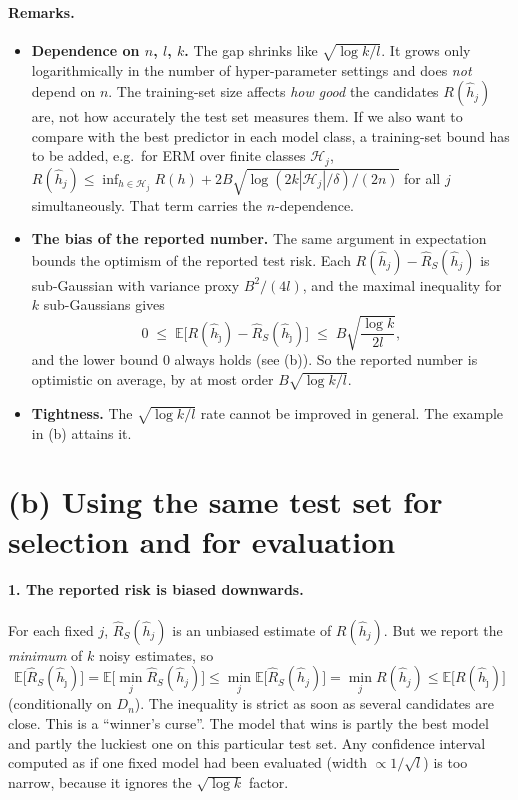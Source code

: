 \documentclass[11pt]{article}
\newcommand{\E}{\mathbb{E}}
\begin{document}
\paragraph{Remarks.}
\begin{itemize}
\item \textbf{Dependence on $n$, $l$, $k$.} The gap shrinks like $\sqrt{\log k/l}$. It grows only
logarithmically in the number of hyper-parameter settings and does \emph{not} depend on $n$.
The training-set size affects \emph{how good} the candidates $R(\hat h_j)$ are, not how accurately
the test set measures them. If we also want to compare with the best predictor in each model class,
a training-set bound has to be added, e.g.\ for ERM over finite classes $\mathcal H_j$,
$R(\hat h_j)\le\inf_{h\in\mathcal H_j}R(h)+2B\sqrt{\log(2k|\mathcal H_j|/\delta)/(2n)}$ for all $j$
simultaneously. That term carries the $n$-dependence.
\item \textbf{The bias of the reported number.} The same argument in expectation bounds the
optimism of the reported test risk. Each $R(\hat h_j)-\widehat R_S(\hat h_j)$ is sub-Gaussian with
variance proxy $B^2/(4l)$, and the maximal inequality for $k$ sub-Gaussians gives
\[
0\;\le\;\E\bigl[R(\hat h_{\hat\jmath})-\widehat R_S(\hat h_{\hat\jmath})\bigr]\;\le\;B\sqrt{\frac{\log k}{2l}} ,
\]
and the lower bound $0$ always holds (see (b)). So the reported number is optimistic on average, by
at most order $B\sqrt{\log k/l}$.
\item \textbf{Tightness.} The $\sqrt{\log k/l}$ rate cannot be improved in general. The example
in (b) attains it.
\end{itemize}

\section*{(b) Using the same test set for selection and for evaluation}

\paragraph{1. The reported risk is biased downwards.}
For each fixed $j$, $\widehat R_S(\hat h_j)$ is an unbiased estimate of $R(\hat h_j)$. But we report
the \emph{minimum} of $k$ noisy estimates, so
\[
\E\bigl[\widehat R_S(\hat h_{\hat\jmath})\bigr]=\E\bigl[\min_j\widehat R_S(\hat h_j)\bigr]
\le\min_j\E\bigl[\widehat R_S(\hat h_j)\bigr]=\min_jR(\hat h_j)\le\E\bigl[R(\hat h_{\hat\jmath})\bigr]
\]
(conditionally on $D_n$). The inequality is strict as soon as several candidates are close. This is
a ``winner's curse''. The model that wins is partly the best model and partly the luckiest one on
this particular test set. Any confidence interval computed as if one fixed model had been evaluated
(width $\propto1/\sqrt l$) is too narrow, because it ignores the $\sqrt{\log k}$ factor.
\end{document}
